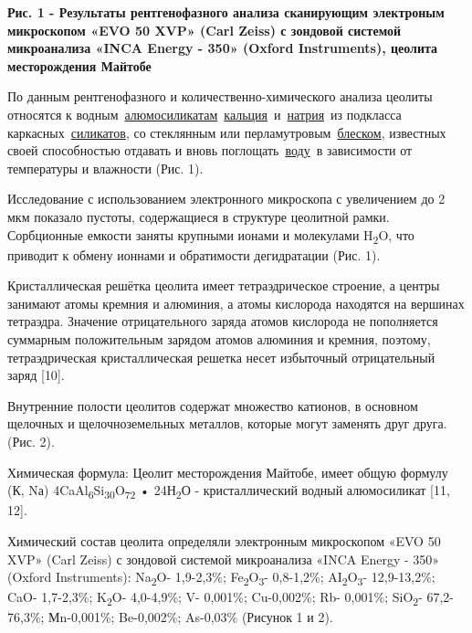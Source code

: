 {\bfseries Рис. 1 - Результаты рентгенофазного анализа сканирующим
электроным микроскопом «EVO 50 XVP» (Carl Zeiss) с зондовой системой
микроанализа «INCA Energy - 350» (Oxford Instruments), цеолита
месторождения Майтобе}

По данным рентгенофазного и количественно-химического анализа цеолиты
относятся к
водным~\href{https://ru.wikipedia.org/wiki/\%D0\%90\%D0\%BB\%D1\%8E\%D0\%BC\%D0\%BE\%D1\%81\%D0\%B8\%D0\%BB\%D0\%B8\%D0\%BA\%D0\%B0\%D1\%82\%D1\%8B}{алюмосиликатам}~\href{https://ru.wikipedia.org/wiki/\%D0\%9A\%D0\%B0\%D0\%BB\%D1\%8C\%D1\%86\%D0\%B8\%D0\%B9}{кальция}~и~\href{https://ru.wikipedia.org/wiki/\%D0\%9D\%D0\%B0\%D1\%82\%D1\%80\%D0\%B8\%D0\%B9}{натрия}~из
подкласса
каркасных~\href{https://ru.wikipedia.org/wiki/\%D0\%A1\%D0\%B8\%D0\%BB\%D0\%B8\%D0\%BA\%D0\%B0\%D1\%82\%D1\%8B_(\%D0\%BC\%D0\%B8\%D0\%BD\%D0\%B5\%D1\%80\%D0\%B0\%D0\%BB\%D1\%8B)}{силикатов},
со стеклянным или
перламутровым~\href{https://ru.wikipedia.org/wiki/\%D0\%91\%D0\%BB\%D0\%B5\%D1\%81\%D0\%BA}{блеском},
известных своей способностью отдавать и вновь
поглощать~\href{https://ru.wikipedia.org/wiki/\%D0\%92\%D0\%BE\%D0\%B4\%D0\%B0}{воду}~в
зависимости от температуры и влажности (Рис. 1).

Исследование с использованием электронного микроскопа с увеличением до 2
мкм показало пустоты, содержащиеся в структуре цеолитной рамки.
Сорбционные емкости заняты крупными ионами и молекулами
H\textsubscript{2}O, что приводит к обмену ионнами и обратимости
дегидратации (Рис. 1).

Кристаллическая решётка цеолита имеет тетраэдрическое строение, а центры
занимают атомы кремния и алюминия, а атомы кислорода находятся на
вершинах тетраэдра. Значение отрицательного заряда атомов кислорода не
пополняется суммарным положительным зарядом атомов алюминия и кремния,
поэтому, тетраэдрическая кристаллическая решетка несет избыточный
отрицательный заряд {[}10{]}.

Внутренние полости цеолитов содержат множество катионов, в основном
щелочных и щелочноземельных металлов, которые могут заменять друг друга.
(Рис. 2).

Химическая формула: Цеолит месторождения Майтобе, имеет общую формулу
(К, Nа) 4CaAl\textsubscript{6}Si\textsubscript{30}O\textsubscript{72} •
24Н\textsubscript{2}О - кристаллический водный алюмосиликат {[}11,
12{]}.

Химический состав цеолита определяли электронным микроскопом «EVO 50
XVP» (Carl Zeiss) с зондовой системой микроанализа «INCA Energy - 350»
(Oxford Instruments): Na\textsubscript{2}O- 1,9-2,3\%;
Fe\textsubscript{2}O\textsubscript{3}- 0,8-1,2\%;
AI\textsubscript{2}O\textsubscript{3}- 12,9-13,2\%; CaO- 1,7-2,3\%;
K\textsubscript{2}O- 4,0-4,9\%; V- 0,001\%; Cu-0,002\%; Rb- 0,001\%;
SiO\textsubscript{2}- 67,2-76,3\%; Мn-0,001\%; Be-0,002\%; As-0,03\%
(Рисунок 1 и 2).

